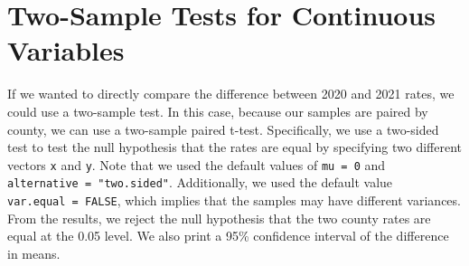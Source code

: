 \documentclass[
  letterpaper,
]{latex/krantz}
\makeatletter
\newenvironment{Shaded}{\begin{snugshade}}{\end{snugshade}}
\newcommand{\AttributeTok}[1]{\textcolor[rgb]{0.40,0.45,0.13}{#1}}
\newcommand{\CommentTok}[1]{\textcolor[rgb]{0.37,0.37,0.37}{#1}}
\newcommand{\FunctionTok}[1]{\textcolor[rgb]{0.28,0.35,0.67}{#1}}
\newcommand{\NormalTok}[1]{\textcolor[rgb]{0.00,0.23,0.31}{#1}}
\newcommand{\OtherTok}[1]{\textcolor[rgb]{0.00,0.23,0.31}{#1}}
\newcommand{\SpecialCharTok}[1]{\textcolor[rgb]{0.37,0.37,0.37}{#1}}
\newcommand{\StringTok}[1]{\textcolor[rgb]{0.13,0.47,0.30}{#1}}
\newenvironment{kframe}{%
\medskip{}
\setlength{\fboxsep}{.8em}
 \def\at@end@of@kframe{}%
 \ifinner\ifhmode%
  \def\at@end@of@kframe{\end{minipage}}%
  \begin{minipage}{\columnwidth}%
 \fi\fi%
 \def\FrameCommand##1{\hskip\@totalleftmargin \hskip-\fboxsep
 \colorbox{shadecolor}{##1}\hskip-\fboxsep
     \hskip-\linewidth \hskip-\@totalleftmargin \hskip\columnwidth}%
 \MakeFramed {\advance\hsize-\width
   \@totalleftmargin\z@ \linewidth\hsize
   \@setminipage}}%
 {\par\unskip\endMakeFramed%
 \at@end@of@kframe}
\renewenvironment{Shaded}{\begin{kframe}}{\end{kframe}}
\makeatother
\begin{document}
\begin{Shaded}
\end{Shaded}

\begin{Shaded}
\end{Shaded}

\section{\texorpdfstring{Two-Sample Tests for Continuous Variables
}{Two-Sample Tests for Continuous Variables }}\label{two-sample-tests-for-continuous-variables}

If we wanted to directly compare the difference between 2020 and 2021
rates, we could use a two-sample test. In this case, because our samples
are paired by county, we can use a two-sample paired t-test.
Specifically, we use a two-sided test to test the null hypothesis that
the rates are equal by specifying two different vectors \texttt{x} and
\texttt{y}. Note that we used the default values of \texttt{mu\ =\ 0}
and \texttt{alternative\ =\ "two.sided"}. Additionally, we used the
default value \texttt{var.equal\ =\ FALSE}, which implies that the
samples may have different variances. From the results, we reject the
null hypothesis that the two county rates are equal at the 0.05 level.
We also print a 95\% confidence interval of the difference in means.
\end{document}
